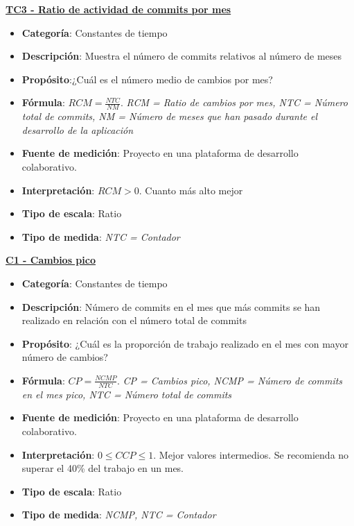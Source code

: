 \textbf{\underline{TC3 - Ratio de actividad de commits por mes}}

\begin{itemize}
	\item \textbf{Categoría}: Constantes de tiempo
	\item \textbf{Descripción}: Muestra el número de commits relativos al número de meses
	\item \textbf{Propósito}:¿Cuál es el número medio de cambios por mes?
	\item \textbf{Fórmula}: $RCM = \frac{NTC}{NM}$. \textit{RCM = Ratio de cambios por mes, NTC = Número total de commits, NM = Número de meses que han pasado durante el desarrollo de la aplicación}
	\item \textbf{Fuente de medición}: Proyecto en una plataforma de desarrollo colaborativo.
	\item \textbf{Interpretación}: $RCM > 0$. Cuanto más alto mejor
	\item \textbf{Tipo de escala}: Ratio
	\item \textbf{Tipo de medida}: \textit{NTC = Contador}
\end{itemize}

\textbf{\underline{C1 - Cambios pico}}

\begin{itemize}
	\item \textbf{Categoría}: Constantes de tiempo
	\item \textbf{Descripción}: Número de commits en el mes que más commits se han realizado en relación con el número total de commits
	\item \textbf{Propósito}: ¿Cuál es la proporción de trabajo realizado en el mes con mayor número de cambios?
	\item \textbf{Fórmula}: $CP = \frac{NCMP}{NTC}$. \textit{CP = Cambios pico, NCMP = Número de commits en el mes pico, NTC = Número total de commits}
	\item \textbf{Fuente de medición}: Proyecto en una plataforma de desarrollo colaborativo.
	\item \textbf{Interpretación}: $0 \leq CCP \leq 1$. Mejor valores intermedios. Se recomienda no superar el 40\% del trabajo en un mes.
	\item \textbf{Tipo de escala}: Ratio
	\item \textbf{Tipo de medida}: \textit{NCMP, NTC = Contador}
\end{itemize}

